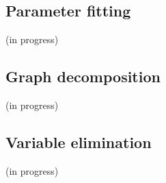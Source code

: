 \subsection{Parameter fitting}
\label{parameter_fitting}

(in progress)

\subsection{Graph decomposition}
\label{graph_decomposition}

(in progress)

\subsection{Variable elimination}
\label{variable_elimination}

(in progress)





















